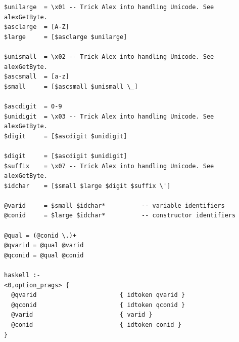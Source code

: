 \begin{lstlisting}[float,label={lst:alex_example},
                   caption={Wycinki z pliku \code{Lexer.x} składające się na reguły opisujące co jest wyodrębniane jako zmienna i konstruktor.}]
$unilarge  = \x01 -- Trick Alex into handling Unicode. See alexGetByte.
$asclarge  = [A-Z]
$large     = [$asclarge $unilarge]

$unismall  = \x02 -- Trick Alex into handling Unicode. See alexGetByte.
$ascsmall  = [a-z]
$small     = [$ascsmall $unismall \_]

$ascdigit  = 0-9
$unidigit  = \x03 -- Trick Alex into handling Unicode. See alexGetByte.
$digit     = [$ascdigit $unidigit]

$digit     = [$ascdigit $unidigit]
$suffix    = \x07 -- Trick Alex into handling Unicode. See alexGetByte.
$idchar    = [$small $large $digit $suffix \']

@varid     = $small $idchar*          -- variable identifiers
@conid     = $large $idchar*          -- constructor identifiers

@qual = (@conid \.)+
@qvarid = @qual @varid
@qconid = @qual @conid

haskell :-
<0,option_prags> {
  @qvarid                       { idtoken qvarid }
  @qconid                       { idtoken qconid }
  @varid                        { varid }
  @conid                        { idtoken conid }
}
\end{lstlisting}

